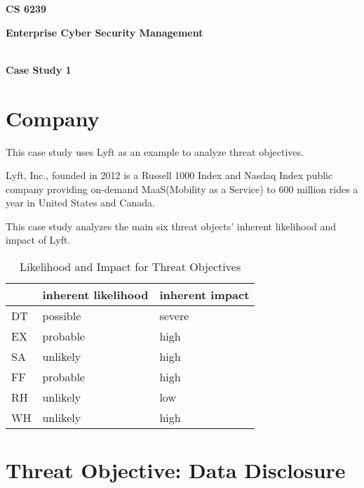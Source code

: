\documentclass[11pt]{article}
\date{}
\begin{document}
\vspace{-5cm}


\begin{center}
\textbf{\Large CS 6239}

\textbf{\Large Enterprise Cyber Security Management}

\textbf{\\ \Large Case Study 1}
\end{center}

\section{Company}

This case study uses Lyft as an example to analyze threat objectives.

Lyft, Inc., founded in 2012  is a Russell 1000 Index and Nasdaq Index public company providing on-demand MaaS(Mobility as a Service) to 600 million rides a year in United States and Canada.

This case study analyzes the main six threat objects' inherent likelihood and impact of Lyft.

\begin{center}
    
\begin{table}[h!]
\begin{tabular}{|l|l|l|}
\hline
   & \textbf{inherent likelihood} & \textbf{inherent impact} \\ \hline
DT & possible            & severe          \\ \hline
EX & probable            & high           \\ \hline
SA & unlikely            & high            \\ \hline
FF & probable            & high            \\ \hline
RH & unlikely            & low          \\ \hline
WH & unlikely            & high          \\ \hline
\end{tabular}
\caption{Likelihood and Impact for Threat Objectives}
\end{table}
\end{center}

\section{Threat Objective: Data Disclosure}
\end{document}
